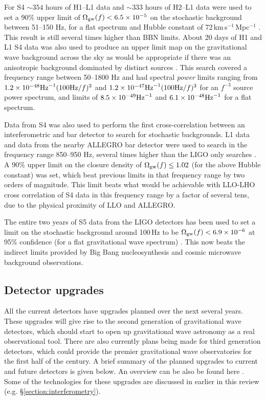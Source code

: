 \documentclass{article}
\begin{document}
For S4 $\sim354$ hours of H1--L1 data and $\sim333$ hours of H2--L1 data were
used to set a 90\% upper limit of $\Omega_{\rm gw}(f) < 6.5\times10^{-5}$ on
the stochastic background between 51--150 Hz, for a flat spectrum and Hubble
constant of 72\,km\,s$^{-1}$\,Mpc$^{-1}$ \cite{Abbott:2007e}. This result is
still several times higher than BBN limits. About 20 days of H1 and L1 S4 data
was also used to produce an upper limit map on the gravitational wave background
across the sky as would be appropriate if there was an anisotropic background
dominated by distinct sources \cite{Abbott:2007f}. This search covered a
frequency range between 50--1800 Hz and had spectral {\it power} limits ranging
from $1.2\times10^{-48} {\rm Hz}^{-1} (100 {\rm Hz}/f)^3$ and $1.2\times10^{-47}
{\rm Hz}^{-1} (100 {\rm Hz}/f)^3$ for an $f^{-3}$ source power spectrum, and
limits of $8.5\times10^{-49} {\rm Hz}^{-1}$ and $6.1\times10^{-48} {\rm
Hz}^{-1}$ for a flat spectrum.

Data from S4 was also used to perform the first cross-correlation between an
interferometric and bar detector to search for stochastic backgrounds. L1 data
and data from the nearby ALLEGRO bar detector were used to search in the
frequency range 850--950 Hz, several times higher than the LIGO only searches
\cite{Abbott:2007g}. A 90\% upper limit on the closure density of $\Omega_{\rm
gw}(f) \leq 1.02$ (for the above Hubble constant) was set, which beat previous
limits in that frequency range by two orders of magnitude. This limit beats what
would be achievable with LLO-LHO cross correlation of S4 data in this frequency
range by a factor of several tens, due to the physical proximity of LLO and
ALLEGRO.

The entire two years of S5 data from the LIGO detectors has been used to set a
limit on the stochastic background around 100\,Hz to be $\Omega_{\rm
gw}(f) < 6.9\times10^{-6}$ at 95\% confidence (for a flat gravitational wave
spectrum) \cite{Abbott:2009b}. This now beats the indirect limits provided by
Big Bang nucleosynthesis and cosmic microwave background observations.

\subsection{Detector upgrades}
All the current detectors have upgrades planned over the next several years.
These upgrades will give rise to the second generation of gravitational wave
detectors, which should start to open up gravitational wave astronomy as a
real observational tool. There are also currently plans being made for third
generation detectors, which could provide the premier gravitational wave
observatories for the first half of the century. A brief summary of the planned
upgrades to current and future detectors is given below. An overview can be also
be found here \cite{Whitcomb:2008}. Some of the technologies for these upgrades
are discussed in earlier in this review (e.g. \S\ref{section:interferometry}).
\end{document}

